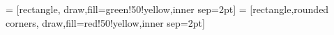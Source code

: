 \documentclass[final,12pt]{elsarticle}
\theoremstyle{definition} \newtheorem{definition}[theorem]{Definition} \newtheorem{observation}[theorem]{Observation} \newtheorem{example}[theorem]{Example} \newtheorem{remark}[theorem]{Remark} \newtheorem{corrolary}[theorem]{Corrolary}
\begin{document}
 = [rectangle, draw,fill=green!50!yellow,inner sep=2pt]
  = [rectangle,rounded corners, draw,fill=red!50!yellow,inner sep=2pt]
\begin{center}
	\scalebox{0.8} {

}
\end{center}
\end{document}
